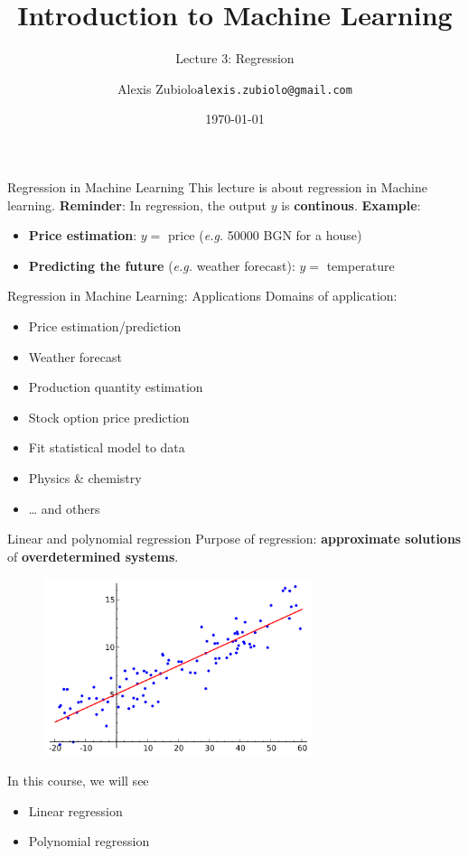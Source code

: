 \documentclass{beamer}
\title[Classification]{Introduction to Machine Learning}
\subtitle{Lecture 3: Regression}
\author{Alexis Zubiolo\newline\texttt{alexis.zubiolo@gmail.com}}
\institute{Data Science Team Lead @ Adcash}
\date{\today}
\begin{document}
\begin{frame}
  \titlepage
\end{frame}

\begin{frame}{Regression in Machine Learning}
This lecture is about regression in Machine learning.
\vfill
\textbf{Reminder}: In regression, the output $y$ is \textbf{continous}.
\vfill
\textbf{Example}:
\begin{itemize}
	\item \textbf{Price estimation}: $y =$ price (\textit{e.g.} 50000 BGN for a house)
	\item \textbf{Predicting the future} (\textit{e.g.} weather forecast): $y =$ temperature
\end{itemize}
\end{frame}

\begin{frame}{Regression in Machine Learning: Applications}
Domains of application:
\begin{itemize}
	\item Price estimation/prediction
	\item Weather forecast
	\item Production quantity estimation
	\item Stock option price prediction
	\item Fit statistical model to data
	\item Physics \& chemistry
	\item \ldots{} and others
\end{itemize}
\end{frame}
%
\begin{frame}{Linear and polynomial regression}
Purpose of regression: \textbf{approximate solutions} of \textbf{overdetermined systems}.
\vfill
\begin{figure}
\centering
\includegraphics[width=0.70\textwidth]{images/2d_regression.png}
\end{figure}
\vfill
In this course, we will see
\begin{itemize}
	\item Linear regression
	\item Polynomial regression
\end{itemize}
\end{frame}
\end{document}
